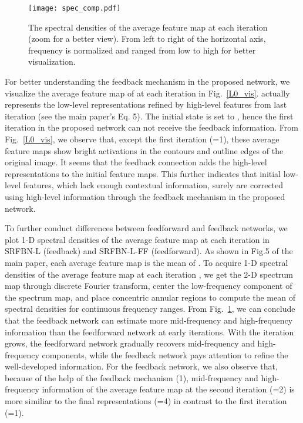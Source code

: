 \documentclass[10pt,twocolumn,letterpaper]{article}
\begin{document}
\begin{figure}[t]
	\centering
	\texttt{[image: spec\_comp.pdf]}
	\caption{The spectral densities of the average feature map at each iteration  (zoom for a better view). From left to right of the horizontal axis, frequency is normalized and ranged from low to high for better visualization.}\label{spec_comp}\end{figure}

For better understanding the feedback mechanism in the proposed network, we visualize the average feature map of  at each iteration  in Fig.~\ref{L0_vis}.  actually represents the low-level representations refined by high-level features  from last iteration (see the main paper's Eq. 5). The initial state  is set to , hence the first iteration in the proposed network can not receive the feedback information. From Fig.~\ref{L0_vis}, we observe that, except the first iteration (=1), these average feature maps show bright activations in the contours and outline edges of the original image. It seems that the feedback connection adds the high-level representations to the initial feature maps. This further indicates that initial low-level features, which lack enough contextual information, surely are corrected using high-level information through the feedback mechanism in the proposed network. 

To further conduct differences between feedforward and feedback networks, we plot 1-D spectral densities of the average feature map at each iteration  in SRFBN-L (feedback) and SRFBN-L-FF (feedforward). As shown in Fig.5 of the main paper, each average feature map is the mean of . To acquire 1-D spectral densities of the average feature map at each iteration , we get the 2-D spectrum map through discrete Fourier transform, center the low-frequency component of the spectrum map, and place concentric annular regions to compute the mean of spectral densities for continuous frequency ranges. From Fig.~\ref{spec_comp}, we can conclude that the feedback network can estimate more mid-frequency and high-frequency information than the feedforward network at early iterations. With the iteration  grows, the feedforward network gradually recovers mid-frequency and high-frequency components, while the feedback network pays attention to refine the well-developed information. For the feedback network, we also observe that,  because of the help of the feedback mechanism (1), mid-frequency and high-frequency information of the average feature map at the second iteration (=2) is more similiar to the final representations (=4) in contrast to the first iteration (=1).
\end{document}
